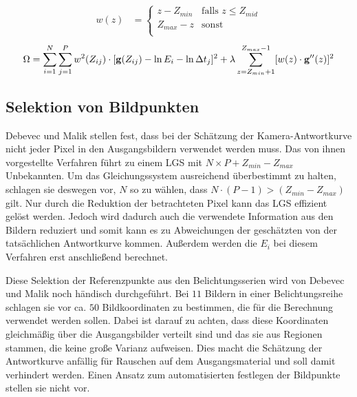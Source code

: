 \begin{align}
\label{eq:w}
w(z) &= \begin{cases} 
z - Z_{min}&  \text{falls } z \leq Z_{mid}  \\ 
Z_{max}-z& \text{sonst}\\
\end{cases}
\end{align}
\begin{equation}
\label{eq:energy:weights}
\Omega = \sum \limits_{i=1}^{N} \sum \limits_{j=1}^{P}w^2(Z_{ij})\cdot[\mathbf g(Z_{ij}) - \ln E_i - \ln \Delta t_j]^2 + \lambda  \sum \limits_{z=Z_{min}+1}^{Z_{max}-1} [w(z) \cdot \mathbf{g}''(z)]^2\\
\end{equation}

\subsection{Selektion von Bildpunkten}
\label{algo:schwachstellen:selektion}
Debevec und Malik stellen fest, dass bei der Schätzung der Kamera-Antwortkurve nicht jeder Pixel in den Ausgangsbildern verwendet werden muss. Das von ihnen vorgestellte Verfahren führt zu einem \gls{LGS} mit $N \times P + Z_{min} - Z_{max}$ Unbekannten. Um das Gleichungssystem ausreichend überbestimmt zu halten, schlagen sie deswegen vor, $N$ so zu wählen, dass $N\cdot(P-1) > (Z_{min}-Z_{max})$ gilt. Nur durch die Reduktion der betrachteten Pixel kann das \gls{LGS} effizient gelöst werden. Jedoch wird dadurch auch die verwendete Information aus den Bildern reduziert und somit kann es zu Abweichungen der geschätzten von der tatsächlichen Antwortkurve kommen. Außerdem werden die $E_i$ bei diesem Verfahren erst anschließend berechnet.

Diese Selektion der Referenzpunkte aus den Belichtungsserien wird von Debevec und Malik noch händisch durchgeführt. Bei $11$ Bildern in einer Belichtungsreihe schlagen sie vor ca. $50$ Bildkoordinaten zu bestimmen, die für die Berechnung verwendet werden sollen. Dabei ist darauf zu achten, dass diese Koordinaten gleichmäßig über die Ausgangsbilder verteilt sind und das sie aus Regionen stammen, die keine große Varianz aufweisen. Dies macht die Schätzung der Antwortkurve anfällig für Rauschen auf dem Ausgangsmaterial und soll damit verhindert werden. Einen Ansatz zum automatisierten festlegen der Bildpunkte stellen sie nicht vor.

